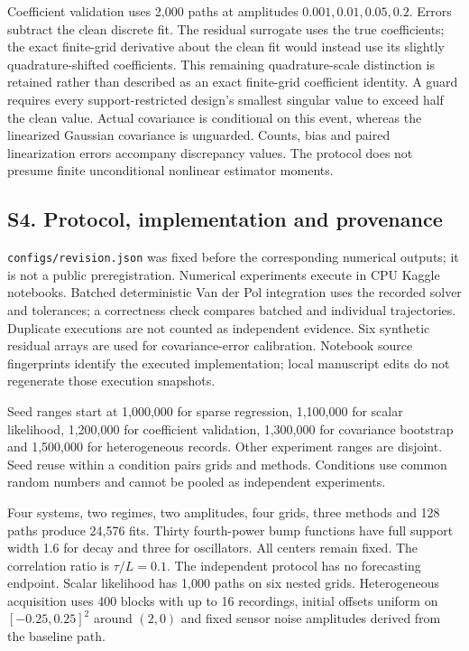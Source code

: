 \documentclass[
  american,
  11pt,
]{article}
\begin{document}
Coefficient validation uses 2,000 paths at amplitudes
\(0.001,0.01,0.05,0.2\). Errors subtract the clean discrete fit. The
residual surrogate uses the true coefficients; the exact finite-grid
derivative about the clean fit would instead use its slightly
quadrature-shifted coefficients. This remaining quadrature-scale
distinction is retained rather than described as an exact finite-grid
coefficient identity. A guard requires every support-restricted design's
smallest singular value to exceed half the clean value. Actual
covariance is conditional on this event, whereas the linearized Gaussian
covariance is unguarded. Counts, bias and paired linearization errors
accompany discrepancy values. The protocol does not presume finite
unconditional nonlinear estimator moments.

\subsection{S4. Protocol, implementation and
provenance}\label{s4.-protocol-implementation-and-provenance}

\texttt{configs/revision.json} was fixed before the corresponding
numerical outputs; it is not a public preregistration. Numerical
experiments execute in CPU Kaggle notebooks. Batched deterministic Van
der Pol integration uses the recorded solver and tolerances; a
correctness check compares batched and individual trajectories.
Duplicate executions are not counted as independent evidence. Six
synthetic residual arrays are used for covariance-error calibration.
Notebook source fingerprints identify the executed implementation; local
manuscript edits do not regenerate those execution snapshots.

Seed ranges start at 1,000,000 for sparse regression, 1,100,000 for
scalar likelihood, 1,200,000 for coefficient validation, 1,300,000 for
covariance bootstrap and 1,500,000 for heterogeneous records. Other
experiment ranges are disjoint. Seed reuse within a condition pairs
grids and methods. Conditions use common random numbers and cannot be
pooled as independent experiments.

Four systems, two regimes, two amplitudes, four grids, three methods and
128 paths produce 24,576 fits. Thirty fourth-power bump functions have
full support width 1.6 for decay and three for oscillators. All centers
remain fixed. The correlation ratio is \(\tau/L=0.1\). The independent
protocol has no forecasting endpoint. Scalar likelihood has 1,000 paths
on six nested grids. Heterogeneous acquisition uses 400 blocks with up
to 16 recordings, initial offsets uniform on \([-0.25,0.25]^2\) around
\((2,0)\) and fixed sensor noise amplitudes derived from the baseline
path.
\end{document}
